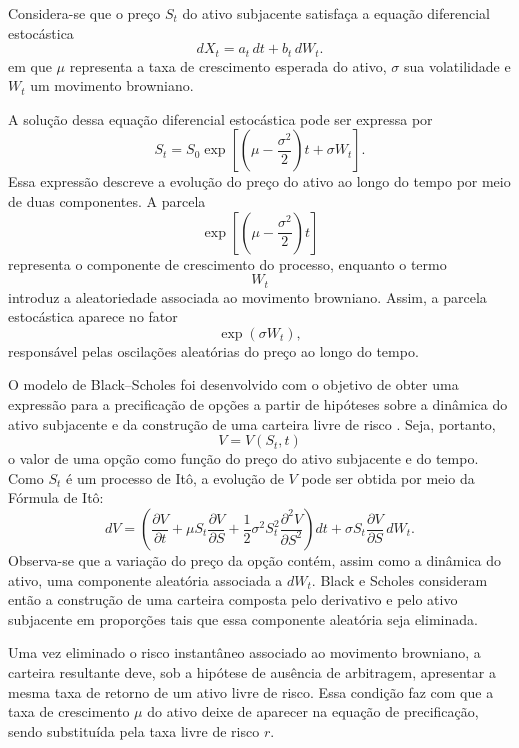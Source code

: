 Considera-se que o preço $S_t$ do ativo subjacente satisfaça a equação
diferencial estocástica
\[
dX_t = a_t\,dt + b_t\,dW_t.
\]
em que $\mu$ representa a taxa de crescimento esperada do ativo,
$\sigma$ sua volatilidade e $W_t$ um movimento browniano.

A solução dessa equação diferencial estocástica pode ser expressa por
\begin{equation}
S_t
=
S_0
\exp\left[
\left(
\mu-\frac{\sigma^2}{2}
\right)t
+
\sigma W_t
\right].
\end{equation}
Essa expressão descreve a evolução do preço do ativo ao longo do tempo por meio de duas componentes. A parcela
\begin{equation}
\exp\left[\left(\mu-\frac{\sigma^2}{2}\right)t\right]
\end{equation}
representa o componente de crescimento do processo, enquanto o termo
\begin{equation}
W_t
\end{equation}
introduz a aleatoriedade associada ao movimento browniano. Assim, a parcela estocástica aparece no fator
\begin{equation}
\exp(\sigma W_t),
\end{equation}
responsável pelas oscilações aleatórias do preço ao longo do tempo.

O modelo de Black--Scholes foi desenvolvido com o objetivo de obter uma
expressão para a precificação de opções a partir de hipóteses sobre a
dinâmica do ativo subjacente e da construção de uma carteira livre de risco
\cite{blackscholes1973}. Seja, portanto,
\begin{equation}
V = V(S_t,t)
\end{equation}
o valor de uma opção como função do preço do ativo subjacente e do tempo.
Como $S_t$ é um processo de Itô, a evolução de $V$ pode ser obtida por
meio da Fórmula de Itô:
\begin{equation}
dV =
\left(
\frac{\partial V}{\partial t}
+
\mu S_t \frac{\partial V}{\partial S}
+
\frac{1}{2}\sigma^2 S_t^2
\frac{\partial^2 V}{\partial S^2}
\right)dt
+
\sigma S_t
\frac{\partial V}{\partial S}
\,dW_t.
\end{equation}
Observa-se que a variação do preço da opção contém, assim como a dinâmica
do ativo, uma componente aleatória associada a $dW_t$. Black e Scholes
consideram então a construção de uma carteira composta pelo derivativo e
pelo ativo subjacente em proporções tais que essa componente aleatória seja
eliminada.

Uma vez eliminado o risco instantâneo associado ao movimento browniano,
a carteira resultante deve, sob a hipótese de ausência de arbitragem,
apresentar a mesma taxa de retorno de um ativo livre de risco. Essa
condição faz com que a taxa de crescimento $\mu$ do ativo deixe de aparecer
na equação de precificação, sendo substituída pela taxa livre de risco $r$.

